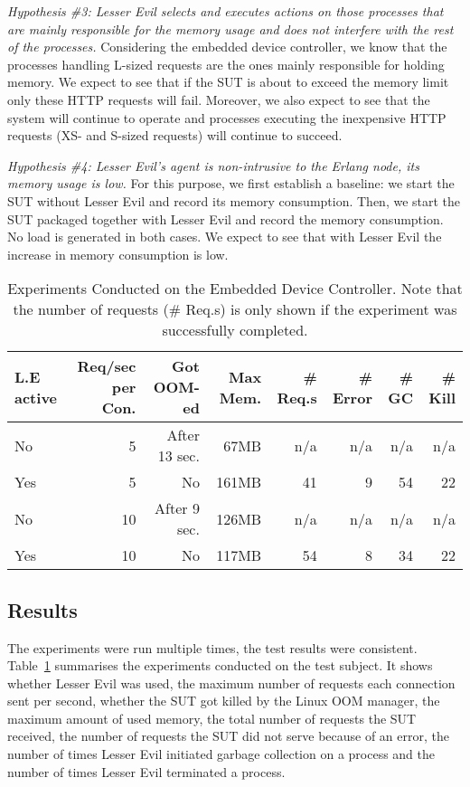 \documentclass{llncs}
\begin{document}
\emph{Hypothesis \#3: Lesser Evil selects and executes actions on those processes that are mainly responsible for the memory usage and does not interfere with the rest of the processes.}  Considering the embedded device controller, we know that the processes handling L-sized requests are the ones mainly responsible for holding memory. We expect to see that if the SUT is about to exceed the memory limit only these HTTP requests will fail. Moreover, we also expect to see that the system will continue to operate and processes executing the inexpensive HTTP requests (XS- and S-sized requests) will continue to succeed.  

\emph{Hypothesis \#4: Lesser Evil's agent is non-intrusive to the Erlang node, its memory usage is low.}  For this purpose, we first  establish a baseline: we start the SUT without Lesser Evil and record its memory consumption. Then, we start the SUT packaged together with Lesser Evil and record the memory consumption. No load is generated in both cases. We expect to see that with Lesser Evil the increase in memory consumption is low.

\begin{table}[htbp]
\centering
 \caption{Experiments Conducted on the Embedded Device Controller. Note that the number of requests (\# Req.s) is only shown if the experiment was successfully completed.}
 \label{tab:ed-results}
\begin{tabular}{| l | r | r | r | r | r | r | r |}
\hline
L.E active& Req/sec per Con.& Got  OOM-ed& Max  Mem.& \# Req.s & \# Error  & \# GC & \# Kill \\
\hline\hline
No & 5 & After 13 sec. & 67MB &  n/a&  n/a & n/a & n/a\\ \hline
Yes & 5 & No & 161MB & 41 & 9 & 54 & 22\\ \hline
No & 10 & After 9 sec. & 126MB &  n/a &  n/a & n/a & n/a\\ \hline
Yes & 10 & No & 117MB & 54 & 8 & 34 & 22\\
\hline
\end{tabular}
\end{table}

\subsection{Results}

The experiments were run multiple times, the test results were consistent. Table~\ref{tab:ed-results} summarises the experiments conducted on the test subject. It shows whether Lesser Evil was used, the maximum number of requests each connection sent per second, whether the SUT got killed by the Linux OOM manager, the maximum amount of used memory, the total number of requests the SUT received, the number of requests the SUT did not serve because of an error, the number of times Lesser Evil initiated garbage collection on a process and the number of times Lesser Evil terminated a process.
\end{document}
